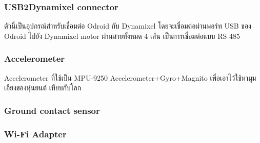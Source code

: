 \subsubsection*{USB2Dynamixel connector}
ตัวนี้เป็นอุปกรณ์สำหรับเชื่อมต่อ Odroid กับ Dynamixel โดยจะเชื่อมต่อผ่านพอร์ท USB ของ Odroid ไปยัง Dynamixel motor
ผ่านสายทั้งหมด 4 เส้น เป็นการเชื่อมต่อแบบ RS-485 
\subsubsection*{Accelerometer}
Accelerometer ที่ใช้เป็น MPU-9250 Accelerometer+Gyro+Magnito เพื่อเอาไว้ใช้หามุมเอียงของหุ่นยนต์
เทียบกับโลก
\subsubsection*{Ground contact sensor}
\subsubsection*{Wi-Fi Adapter}